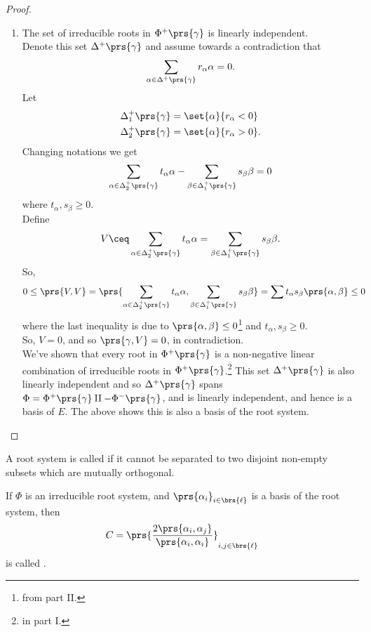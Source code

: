\documentclass[10pt,a4paper,twoside,openany,hidelinks]{book}
\begin{document}
\begin{proof}
\begin{enumerate}[label = \Roman*.]
\item The set of irreducible roots in $\Phi^+\prs{\gamma}$ is linearly independent.\\
Denote this set $\Delta^+\prs{\gamma}$ and assume towards a contradiction that
\[\sum_{\alpha \in \Delta^+\prs{\gamma}} r_{\alpha} \alpha = 0 \text{.}\]
Let
\begin{align*}
\Delta_1^+\prs{\gamma} &= \set{\alpha}{r_{\alpha} < 0} \\
\Delta_2^+\prs{\gamma} &= \set{\alpha}{r_{\alpha} > 0}\text{.}
\end{align*}
Changing notations we get
\[\sum_{\alpha \in \Delta_2^+\prs{\gamma}} t_{\alpha}\alpha - \sum_{\beta \in \Delta_1^+\prs{\gamma}} s_{\beta} \beta = 0\]
where $t_{\alpha} , s_{\beta} \geq 0$.\\
Define \[V \ceq \sum_{\alpha \in \Delta_2^+\prs{\gamma}} t_{\alpha} \alpha = \sum_{\beta \in \Delta_1^+\prs{\gamma}} s_{\beta} \beta \text{.}\]
So,
\begin{align*}
0\leq \prs{V,V} &= \prs{\sum_{\alpha \in \Delta_2^+\prs{\gamma}} t_{\alpha}\alpha, \sum_{\beta \in \Delta_1^+\prs{\gamma}} s_{\beta} \beta} =
\sum_{\substack{}} t_{\alpha} s_{\beta} \prs{\alpha,\beta} \leq 0
\end{align*}
where the last inequality is due to $\prs{\alpha, \beta} \leq 0$\footnote{from part II.} and $t_{\alpha}, s_{\beta} \geq 0$.\\
So, $V = 0$, and so $\prs{\gamma,V} = 0$, in contradiction.\\
We've shown that every root in $\Phi^+\prs{\gamma}$ is a non-negative linear combination of irreducible roots in $\Phi^+\prs{\gamma}$.\footnote{in part I.}
This set $\Delta^+\prs{\gamma}$ is also linearly independent and so $\Delta^+\prs{\gamma}$ spans $\Phi = \Phi^+\prs{\gamma} \amalg - \Phi^-\prs{\gamma}$, and is linearly independent, and hence is a basis of $E$. The above shows this is also a basis of the root system.
\end{enumerate}
\end{proof}

\begin{definition}
A root system is called  if it cannot be separated to two disjoint non-empty subsets which are mutually orthogonal.
\end{definition}

\begin{definition}
If $\Phi$ is an irreducible root system, and $\prs{\alpha_i}_{i \in \brs{\ell}}$ is a basis of the root system, then
\[C = \prs{\frac{2\prs{\alpha_i, \alpha_j}}{\prs{\alpha_i, \alpha_i}}}_{i,j \in \brs{\ell}}\]
is called .
\end{definition}
\end{document}
